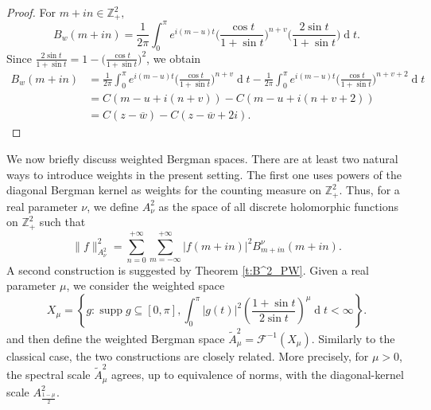\documentclass[12pt,a4paper,reqno]{amsart}
\DeclareMathOperator*{\supp}{supp}
\theoremstyle{definition}
\theoremstyle{definition}\newtheorem{defn}[thm]{Definition}
\begin{document}
\begin{proof}

   
   For $m+in\in\mathbb{Z}^2_+,$
    \[
    B_w(m+in)=\frac{1}{2\pi}\int_0^{\pi}  e^{i(m-u)t}\Big(\frac{\cos t}{1+\sin t}\Big)^{n+v}\Big(\frac{2\sin t}{1+\sin t}\Big) \operatorname{d}\!t.
    \]
    Since $\frac{2\sin t}{1+\sin t}=1-\big(\frac{\cos t}{1+\sin t}\big)^2$, we obtain 
    \begin{align*}
    B_w(m+in)&=\frac{1}{2\pi}\int_0^{\pi}  e^{i(m-u)t}\Big(\frac{\cos t}{1+\sin t}\Big)^{n+v}\operatorname{d}\!t-\frac{1}{2\pi}\int_0^{\pi}  e^{i(m-u)t}\Big(\frac{\cos t}{1+\sin t}\Big)^{n+v+2} \operatorname{d}\!t\\
    &=C(m-u+i(n+v))-C(m-u+i(n+v+2))\\
    &=C(z-\overline w)-C(z-\overline{w}+2i).
    \end{align*}
    \end{proof}
    We now briefly discuss weighted Bergman spaces. There are at least two natural
    ways to introduce weights in the present setting. The first one uses powers of the diagonal Bergman
    kernel as weights for the counting measure on \(\mathbb Z^2_+\). Thus, for a
    real parameter \(\nu\), we define \(A^2_\nu\) as the space of all discrete
    holomorphic functions on \(\mathbb Z^2_+\) such that
    \[
    \|f\|^2_{A^2_\nu}=\sum_{n=0}^{+\infty}\sum_{m=-\infty}^{+\infty}|f(m+in)|^2 B^\nu_{m+in}(m+in).
    \]
    A second construction is suggested by Theorem \ref{t:B^2_PW}. Given a real parameter $\mu$, we consider the weighted space 
    \[
    X_\mu=\left\{g: \supp g\subseteq [0,\pi], \int_0^\pi|g(t)|^2\left(\frac{1+\sin t}{2\sin t} \right)^\mu\operatorname{d}\! t<\infty\right\}.
    \]
    and then define the weighted Bergman space $\widetilde A^2_\mu=\mathcal F^{-1}(X_\mu)$. Similarly to the classical case, the two constructions are closely related.  More precisely, for $\mu>0$, the
    spectral scale $\widetilde A^2_\mu$ agrees, up to equivalence of norms, with
    the diagonal-kernel scale $A^2_{\frac{1-\mu}{2}}$.
    
\end{document}
